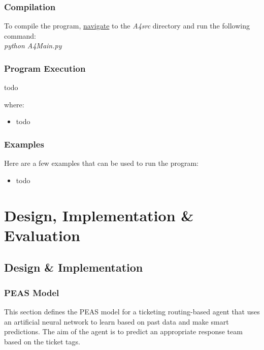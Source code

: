 \documentclass[letterpaper,12pt]{article}
\begin{document}
\subsubsection{Compilation}

To compile the program, \underline{navigate} to the \textit{A4src} directory and run the following command:\\

\textit{python A4Main.py}

\subsubsection{Program Execution}

todo

where:

\begin{itemize}
    \item todo
\end{itemize}

\subsubsection{Examples}

Here are a few examples that can be used to run the program:

\begin{itemize}
    \item todo
\end{itemize}


\section{Design, Implementation \& Evaluation}
\label{sec:design-implementation-evaluation}

\subsection{Design \& Implementation}


\subsubsection{PEAS Model}

This section defines the PEAS model for a ticketing routing-based agent that uses an artificial neural network to learn based on past data and make smart predictions. The aim of the agent is to predict an appropriate response team based on the ticket tags.
\end{document}
